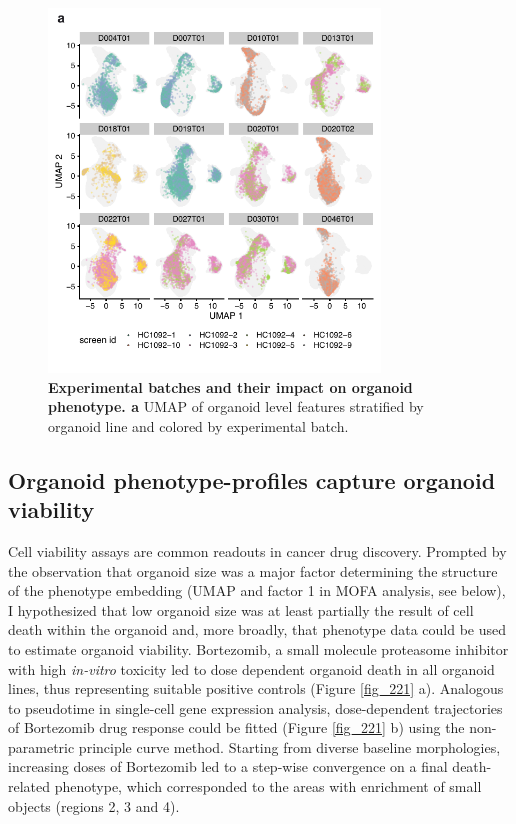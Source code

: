 \begin{flushleft}
\bigbreak

\begin{figure}[!h]
\centering
\includegraphics[width=250pt,
                height=\textheight,
                keepaspectratio]{figures/promise/pdf/fig_1_6.pdf}
\caption[Experimental batches and their impact on organoid phenotype]{\textbf{Experimental batches and their impact on organoid phenotype. a} UMAP of organoid level features stratified by organoid line and colored by experimental batch.}
\label{fig_216}
\end{figure}


\subsection{Organoid phenotype-profiles capture organoid viability}

Cell viability assays are common readouts in cancer drug discovery. Prompted by the observation that organoid size was a major factor determining the structure of the phenotype embedding (UMAP and factor 1 in MOFA analysis, see below), I hypothesized that low organoid size was at least partially the result of cell death within the organoid and, more broadly, that phenotype data could be used to estimate organoid viability. Bortezomib, a small molecule proteasome inhibitor with high \textit{in-vitro} toxicity led to dose dependent organoid death in all organoid lines, thus representing suitable positive controls (Figure \ref{fig_221} a). Analogous to pseudotime in single-cell  gene expression analysis, dose-dependent trajectories of Bortezomib drug response could be fitted (Figure \ref{fig_221} b) using the non-parametric principle curve method. Starting from diverse baseline morphologies, increasing doses of Bortezomib led to a step-wise convergence on a final death-related phenotype, which corresponded to the areas with enrichment of small objects (regions 2, 3 and 4). 


\end{flushleft}
